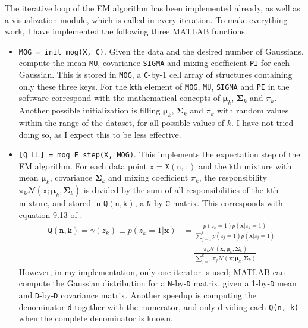 \documentclass[a4paper,11pt]{article}
\newcommand{\V}[1]{\ensuremath{\mathbf{#1}}}
\newcommand{\T}[1]{\ensuremath{\mathtt{#1}}}
\newcommand{\muk}{\ensuremath{\boldsymbol{\mu}_k}}
\newcommand{\covk}{\ensuremath{\boldsymbol{\Sigma}_k}}
\newcommand{\mck}{\ensuremath{\pi_{k}}}
\begin{document}
The iterative loop of the EM algorithm has been implemented already, as well as a visualization module, which is called in every iteration.  To make everything work, I have implemented the following three MATLAB functions.
\begin{itemize}
\item \texttt{MOG = init\_mog(X, C)}.  Given the data and the desired number of Gaussians, compute the mean \texttt{MU}, covariance \texttt{SIGMA} and mixing coefficient \texttt{PI} for each Gaussian.  This is stored in \texttt{MOG}, a \texttt{C}-by-1 cell array of structures containing only these three keys.  For the $\T{k}$th element of \texttt{MOG}, \texttt{MU}, \texttt{SIGMA} and \texttt{PI} in the software correspond with the mathematical concepts of $\muk$, $\covk$ and $\mck$.  Another possible initialization is filling $\muk$, $\covk$ and $\mck$ with random values within the range of the dataset, for all possible values of $k$.  I have not tried doing so, as I expect this to be less effective.
%
\item \texttt{[Q LL] = mog\_E\_step(X, MOG)}.  This implements the expectation step of the EM algorithm.  For each data point $\mathtt{x} = \mathtt{X(n, :)}$ and the $\T{k}$th mixture with mean $\muk$, covariance $\covk$ and mixing coefficient $\mck$, the responsibility $\mck \mathcal{N}(\T{x} ; \muk, \covk)$ is divided by the sum of all responsibilities of the $\T{k}$th mixture, and stored in $\T{Q(n, k)}$, a $\T{N}$-by-$\T{C}$ matrix.  This corresponds with equation 9.13 of \cite{Bishop}:
\begin{align*}
\T{Q(n, k)} = \gamma(z_k) \equiv p(z_k = 1 | \V{x}) 
    &= \frac{p(z_k = 1) p(\V{x} | z_k = 1)}{\sum_{j=1}^{k} p(z_j = 1) p(\V{x} | z_j = 1)} \\
    &= \frac{\mck \mathcal{N}(\V{x} ; \muk, \covk)}{\sum_{j=1}^{k} \pi_j \mathcal{N}(\V{x} ; \muk, \covk)}
\end{align*}
However, in my implementation, only one iterator is used; MATLAB can compute the Gaussian distribution for a \texttt{N}-by-\texttt{D} matrix, given a 1-by-\texttt{D} mean and \texttt{D}-by-\texttt{D} covariance matrix.  Another speedup is computing the denominator \texttt{d} together with the numerator, and only dividing each \texttt{Q(n, k)} when the complete denominator is known.


\end{itemize}
\end{document}
